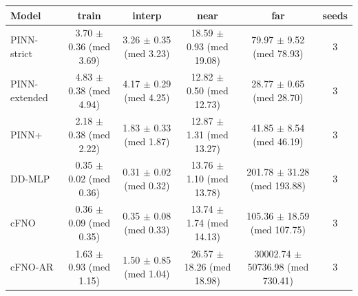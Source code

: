 \begin{tabular}{lccccc}
\toprule
Model & train & interp & near & far & seeds \\
\midrule
PINN-strict & 3.70 $\pm$ 0.36 (med 3.69) & 3.26 $\pm$ 0.35 (med 3.23) & 18.59 $\pm$ 0.93 (med 19.08) & 79.97 $\pm$ 9.52 (med 78.93) & 3 \\
PINN-extended & 4.83 $\pm$ 0.38 (med 4.94) & 4.17 $\pm$ 0.29 (med 4.25) & 12.82 $\pm$ 0.50 (med 12.73) & 28.77 $\pm$ 0.65 (med 28.70) & 3 \\
PINN+ & 2.18 $\pm$ 0.38 (med 2.22) & 1.83 $\pm$ 0.33 (med 1.87) & 12.87 $\pm$ 1.31 (med 13.27) & 41.85 $\pm$ 8.54 (med 46.19) & 3 \\
DD-MLP & 0.35 $\pm$ 0.02 (med 0.36) & 0.31 $\pm$ 0.02 (med 0.32) & 13.76 $\pm$ 1.10 (med 13.78) & 201.78 $\pm$ 31.28 (med 193.88) & 3 \\
cFNO & 0.36 $\pm$ 0.09 (med 0.35) & 0.35 $\pm$ 0.08 (med 0.33) & 13.74 $\pm$ 1.74 (med 14.13) & 105.36 $\pm$ 18.59 (med 107.75) & 3 \\
cFNO-AR & 1.63 $\pm$ 0.93 (med 1.15) & 1.50 $\pm$ 0.85 (med 1.04) & 26.57 $\pm$ 18.26 (med 18.98) & 30002.74 $\pm$ 50736.98 (med 730.41) & 3 \\
\bottomrule
\end{tabular}
